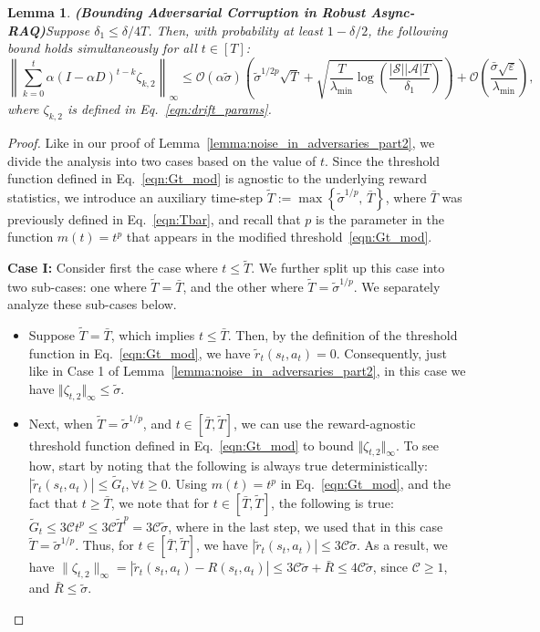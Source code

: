 \documentclass{article}
\newcommand{\mc}{\mathcal}
\newtheorem{lemma}{Lemma}
\begin{document}
\begin{lemma}\textbf{(Bounding Adversarial Corruption in Robust Async-RAQ)}\label{lemma:RAQproof}
Suppose \(\delta_1 \leq \delta/4T\). Then, with probability at least $1-\delta/2$, the following bound holds simultaneously for all \(t \in [T]\):
\[
\left\lVert \sum_{k=0}^{t} \alpha (I-\alpha D)^{t-k} \mathcal{\zeta}_{k,2}\right\rVert_\infty
\leq 
\mathcal{O}(\alpha \tilde{\sigma}) \left( 
    \tilde{\sigma}^{1/2p} \sqrt{T} 
    + \sqrt{ \frac{T}{\lambda_{\min}} \log\left( \frac{|\mathcal{S}||\mathcal{A}|T}{\delta_1} \right) }
\right) 
+ \mathcal{O}\left( \frac{ \bar{\sigma} \sqrt{\varepsilon} }{ \lambda_{\min} } \right), 
\]
where \(\zeta_{k,2}\) is defined in Eq.~\eqref{eqn:drift_params}.
\end{lemma}
\begin{proof}
Like in our proof of Lemma~\ref{lemma:noise_in_adversaries_part2}, we divide the analysis into two cases based on the value of \(t\). Since the threshold function defined in Eq.~\eqref{eqn:Gt_mod} is agnostic to the underlying reward statistics, we introduce an auxiliary time-step  \(\tilde{T} := \max\left\{ \tilde{\sigma}^{1/p},\, \bar{T} \right\}\), where \(\bar{T}\) was previously defined in Eq.~\eqref{eqn:Tbar}, and recall that \(p\) is the parameter in the function $m(t) =t^p$ that appears in the modified threshold~\eqref{eqn:Gt_mod}. 

\textbf{Case I:} Consider first the case where $t \leq \tilde{T}.$ We further split up this case into two sub-cases: one where \(\tilde{T} = \bar{T}\), and the other where \(\tilde{T} = \tilde{\sigma}^{1/p}\). We separately analyze these sub-cases below. 
\begin{itemize}
    \item Suppose \(\tilde{T} = \bar{T}\), which implies \(t \leq  \bar{T}\). Then, by the definition of the threshold function in Eq.~\eqref{eqn:Gt_mod}, we have \(\tilde{r}_t(s_t, a_t) = 0\). Consequently, just like in Case 1 of Lemma~\ref{lemma:noise_in_adversaries_part2}, in this case we have \( \Vert \zeta_{t,2} \Vert_{\infty} \leq \tilde{\sigma}. \) 
    
    \item Next, when \(\tilde{T} = \tilde{\sigma}^{1/p}\), and \(t \in [\bar{T}, \tilde{T}]\), we can use the reward-agnostic threshold function defined in Eq.~\eqref{eqn:Gt_mod} to bound \( \Vert \zeta_{t,2} \Vert_{\infty}\). To see how, start by noting that the following is always true deterministically: $|\tilde{r}_t(s_t, a_t)| \leq \tilde{G}_t, \forall t \geq 0.$ Using \(m(t) = t^p\) in Eq.~\eqref{eqn:Gt_mod}, and the fact that $t \geq \bar{T}$, we note that for \(t \in [\bar{T}, \tilde{T}]\), the following is true: $\tilde{G}_t \leq 3 \mathcal{C} t^p \leq 3 \mathcal{C} \tilde{T}^p = 3 \mc{C} \tilde{\sigma}$, where in the last step, we used that in this case \(\tilde{T} = \tilde{\sigma}^{1/p}\). Thus, for \(t \in [\bar{T}, \tilde{T}]\), we have $|\tilde{r}_t(s_t, a_t)| \leq 3 \mc{C} \tilde{\sigma}$. As a result, we have \(\| \zeta_{t,2} \|_\infty = |\tilde{r}_t(s_t, a_t) - R(s_t, a_t)| \leq 3 \mathcal{C} \tilde{\sigma} + \bar{R} \leq 4 \mathcal{C} \tilde{\sigma}\), since \(\mathcal{C} \geq 1\), and \(\bar{R} \le \tilde{\sigma}\). 
\end{itemize}


\end{proof}
\end{document}
